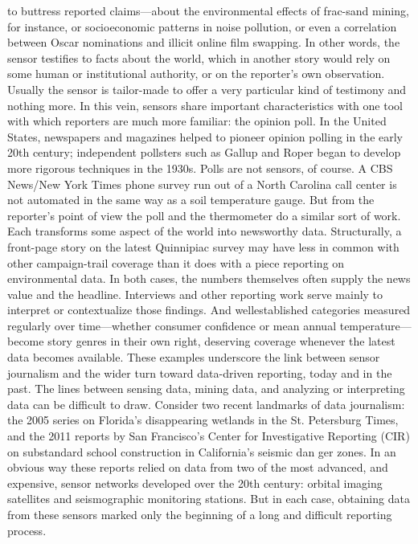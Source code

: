 \begin{itemize}
to buttress reported claims—about the environmental effects of frac-sand
mining, for instance, or socioeconomic patterns in noise pollution, or even
a correlation between Oscar nominations and illicit online film swapping.
In other words, the sensor testifies to facts about the world, which in
another story would rely on some human or institutional authority, or on
the reporter's own observation. Usually the sensor is tailor-made to offer
a very particular kind of testimony and nothing more. In this vein, sensors
share important characteristics with one tool with which reporters are
much more familiar: the opinion poll. In the United States, newspapers and
magazines helped to pioneer opinion polling in the early 20th century; independent
pollsters such as Gallup and Roper began to develop more rigorous
techniques in the 1930s. Polls are not sensors, of course. A CBS News/New
York Times phone survey run out of a North Carolina call center is not automated
in the same way as a soil temperature gauge. But from the reporter's
point of view the poll and the thermometer do a similar sort of work. Each
transforms some aspect of the world into newsworthy data.
Structurally, a front-page story on the latest Quinnipiac survey may have
less in common with other campaign-trail coverage than it does with a piece
reporting on environmental data. In both cases, the numbers themselves
often supply the news value and the headline. Interviews and other reporting
work serve mainly to interpret or contextualize those findings. And wellestablished
categories measured regularly over time—whether consumer
confidence or mean annual temperature—become story genres in their own
right, deserving coverage whenever the latest data becomes available.
These examples underscore the link between sensor journalism and the
wider turn toward data-driven reporting, today and in the past. The lines
between sensing data, mining data, and analyzing or interpreting data can
be difficult to draw. Consider two recent landmarks of data journalism: the
2005 series on Florida's disappearing wetlands in the St. Petersburg Times,
and the 2011 reports by San Francisco's Center for Investigative Reporting
(CIR) on substandard school construction in California's seismic dan
ger zones. In an obvious way these reports relied on data from two of the
most advanced, and expensive, sensor networks developed over the 20th
century: orbital imaging satellites and seismographic monitoring stations.
But in each case, obtaining data from these sensors marked only the beginning
of a long and difficult reporting process.

\end{itemize}
